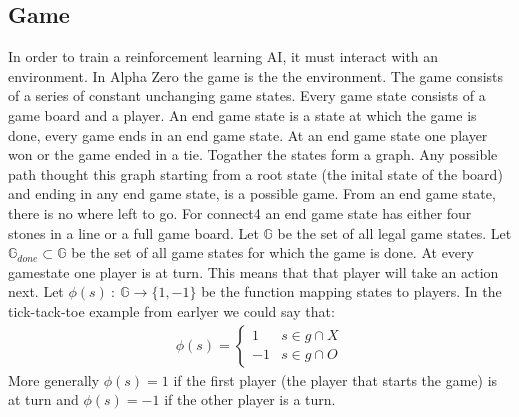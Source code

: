 \documentclass[12pt]{article}
\begin{document}
\subsection{Game}
In order to train a reinforcement learning AI, it must interact with an environment. In Alpha Zero the game is the the environment. The game consists of a series of constant unchanging game states. Every game state consists of a game board and a player. An end game state is a state at which the game is done, every game ends in an end game state. At an end game state one player won or the game ended in a tie. Togather the states form a graph. Any possible path thought this graph starting from a root state (the inital state of the board) and ending in any end game state, is a possible game. From an end game state, there is no where left to go.
For connect4 an end game state has either four stones in a line or a full game board.
Let \(\mathbb{G}\) be the set of all legal game states.
Let \(\mathbb{G}_{done} \subset \mathbb G\) be the set of all game states for which the game is done. At every gamestate one player is at turn. This means that that player will take an action next. Let \(\phi(s)~:~\mathbb{G}\to\{1,-1\}\) be the function mapping states to players. In the tick-tack-toe example from earlyer we could say that:
\begin{align}
\phi(s) = \left\{\begin{matrix}
1 & s \in g\cap X\\
-1 & s \in g\cap O
\end{matrix}\right.
\end{align}
More generally \(\phi(s) = 1\) if the first player (the player that starts the game) is at turn and \(\phi(s) = -1\) if the other player is a turn.
\end{document}
